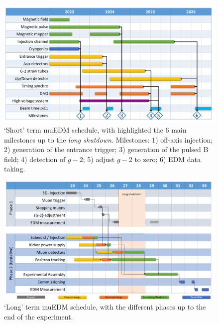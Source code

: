 \begin{refsection}
\begin{figure}
    \centering
    \includegraphics[width = \textwidth]{Figures/muEDM/Schedule2023-2026.png}
    \caption[muEDM: \textit{Short} term schedule]{`Short' term muEDM schedule, with highlighted the 6 main milestones up to the \textit{long shutdown}. Milestones: 1) off-axis injection; 2) generation of the entrance trigger; 3) generation of the pulsed B field; 4) detection of $g-2$; 5) adjust $g-2$ to zero; 6) EDM data taking.}
    \label{fig:muEDM:schedule:short}
\end{figure}
   
\begin{figure}
    \centering
    \includegraphics[width = \textwidth]{Figures/muEDM/SchedPropLongTerm23.png}
    \caption[muEDM: \textit{Long} term schedule]{`Long' term muEDM schedule, with the different phases up to the end of the experiment.}
    \label{fig:muEDM:schedule:long}
\end{figure}

\printbibliography[
    heading = bibliographychapter,
    title=Bibliography on muEDM
]

\end{refsection}
